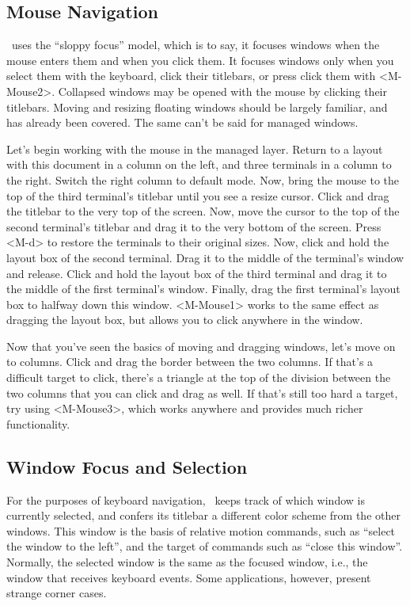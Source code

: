 \subsection{Mouse Navigation}

\wmii\ uses the “sloppy focus” model, which is to say, it focuses
windows when the mouse enters them and when you click them. It
focuses windows only when you select them with the keyboard,
click their titlebars, or press click them with <M-Mouse2>.
Collapsed windows may be opened with the mouse by clicking their
titlebars. Moving and resizing floating windows should be
largely familiar, and has already been covered. The same can't
be said for managed windows.

Let's begin working with the mouse in the managed layer. Return
to a layout with this document in a column on the left, and
three terminals in a column to the right. Switch the right
column to default mode. Now, bring the mouse to the top of the
third terminal's titlebar until you see a resize cursor. Click
and drag the titlebar to the very top of the screen. Now, move
the cursor to the top of the second terminal's titlebar and drag
it to the very bottom of the screen. Press <M-d> to restore the
terminals to their original sizes. Now, click and hold the
layout box of the second terminal. Drag it to the middle of the
terminal's window and release. Click and hold the layout box of
the third terminal and drag it to the middle of the first
terminal's window. Finally, drag the first terminal's layout box
to halfway down this window. <M-Mouse1> works to the same
effect as dragging the layout box, but allows you to click
anywhere in the window.

Now that you've seen the basics of moving and dragging windows,
let's move on to columns. Click and drag the border between the
two columns. If that's a difficult target to click, there's a
triangle at the top of the division between the two columns that
you can click and drag as well. If that's still too hard a
target, try using <M-Mouse3>, which works anywhere and provides
much richer functionality.

\subsection{Window Focus and Selection}

For the purposes of keyboard navigation, \wmii\ keeps track of
which window is currently selected, and confers its titlebar a
different color scheme from the other windows. This window is
the basis of relative motion commands, such as “select the
window to the left”, and the target of commands such as “close
this window”. Normally, the selected window is the same as the
focused window, i.e., the window that receives keyboard events.
Some applications, however, present strange corner cases.

